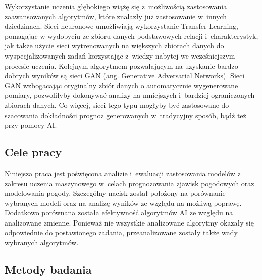 Wykorzystanie uczenia głębokiego wiążę się z~możliwością zastosowania 
zaawansowanych algorytmów, które znalazły już zastosowanie w~innych dziedzinach.
Sieci neuronowe umożliwiają wykorzystanie Transfer Learning, pomagając w
wydobyciu ze zbioru danych podstawowych relacji i~charakterystyk, jak także
użycie sieci wytrenowanych na większych zbiorach danych do wyspecjalizowanych
zadań korzystając z~wiedzy nabytej we wcześniejszym procesie uczenia. Kolejnym 
algorytmem pozwalającym na uzyskanie bardzo dobrych wyników są sieci GAN (ang. 
Generative Adversarial Networks). Sieci GAN wzbogacając oryginalny zbiór danych o
automatycznie wygenerowane pomiary, pozwoliłyby dokonywać analizy na mniejszych i~bardziej ograniczonych zbiorach danych. Co więcej, sieci tego typu mogłyby
być zastosowane do szacowania dokładności prognoz generowanych w~tradycyjny sposób,
bądź też przy pomocy AI.


\subsection*{Cele pracy}\label{subsec:goals}


Niniejsza praca jest poświęcona analizie i~ewaluacji zastosowania modelów 
z zakresu uczenia maszynowego w~celach prognozowania zjawisk pogodowych oraz
modelowania pogody. Szczególny nacisk został położony na porównanie wybranych
modeli oraz na analizę wyników ze względu na możliwą poprawę. Dodatkowo 
porównana została efektywność algorytmów AI ze względu na analizowane zmienne.
Ponieważ nie wszystkie analizowane algorytmy okazały się odpowiednie do postawionego
zadania, przeanalizowane zostały także wady wybranych algorytmów.

\subsection*{Metody badania}\label{subsec:methods}

